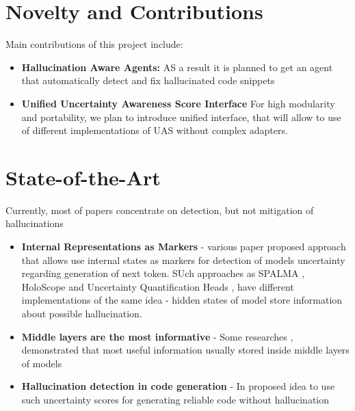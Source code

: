 \documentclass[11pt,a4paper]{article}
\begin{document}
\section{Novelty and Contributions}

Main contributions of this project include:

\begin{itemize}

    \item \textbf{Hallucination Aware Agents:}
    AS a result it is planned to get an agent that automatically detect
    and fix hallucinated code snippets

    \item \textbf{Unified Uncertainty Awareness Score Interface}
    For high modularity and portability, we plan to introduce unified
    interface, that will allow to use of different implementations of UAS
    without complex adapters.

\end{itemize}


\section{State-of-the-Art}

Currently, most of papers concentrate on detection, but not
mitigation of hallucinations

\begin{itemize}
    \item \textbf{Internal Representations as Markers} - various paper proposed
    approach that allows use internal states as markers for detection of models
    uncertainty regarding generation of next token. SUch approaches as SPALMA \cite{azaria2023internalstatellmknows}, HoloScope \cite{du2024haloscopeharnessingunlabeledllm}
    and Uncertainty Quantification Heads \cite{shelmanov2025headpredictheadquestion}, have different implementations of the same 
    idea - hidden states of model store information about possible hallucination.
    \item \textbf{Middle layers are the most informative} - Some researches \cite{azaria2023internalstatellmknows}, \cite{duan2024llmsknowhallucinationempirical} demonstrated 
    that most useful information usually stored inside middle layers of models
    \item \textbf{Hallucination detection in code generation} - In \cite{andriushchenko2026efficient} proposed idea
    to use such uncertainty scores for generating reliable code without hallucination 
\end{itemize}
\end{document}

